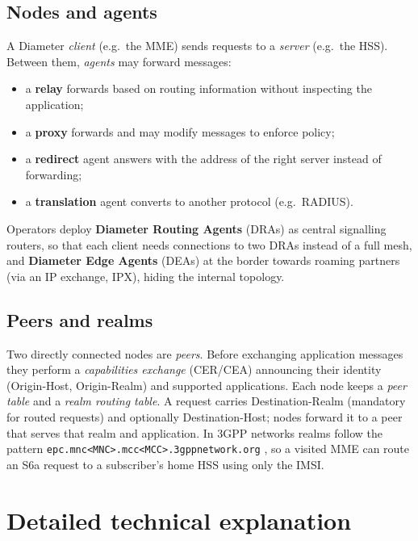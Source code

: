 \documentclass[11pt,a4paper]{article}
\begin{document}
\subsection{Nodes and agents}
A Diameter \emph{client} (e.g.\ the MME) sends requests to a \emph{server} (e.g.\ the HSS). Between
them, \emph{agents} may forward messages:
\begin{itemize}
  \item a \textbf{relay} forwards based on routing information without inspecting the application;
  \item a \textbf{proxy} forwards and may modify messages to enforce policy;
  \item a \textbf{redirect} agent answers with the address of the right server instead of forwarding;
  \item a \textbf{translation} agent converts to another protocol (e.g.\ RADIUS).
\end{itemize}
Operators deploy \textbf{Diameter Routing Agents} (DRAs) as central signalling routers, so that each
client needs connections to two DRAs instead of a full mesh, and \textbf{Diameter Edge Agents} (DEAs) at
the border towards roaming partners (via an IP exchange, IPX), hiding the internal topology.

\subsection{Peers and realms}
Two directly connected nodes are \emph{peers}. Before exchanging application messages they perform a
\emph{capabilities exchange} (CER/CEA) announcing their identity (Origin-Host, Origin-Realm) and supported
applications. Each node keeps a \emph{peer table} and a \emph{realm routing table}. A request carries
Destination-Realm (mandatory for routed requests) and optionally Destination-Host; nodes forward it to a
peer that serves that realm and application. In 3GPP networks realms follow the pattern
\texttt{epc.mnc<MNC>.mcc<MCC>.3gppnetwork.org} \cite{ts23003}, so a visited MME can route an S6a request to
a subscriber's home HSS using only the IMSI.

\section{Detailed technical explanation}
\end{document}
